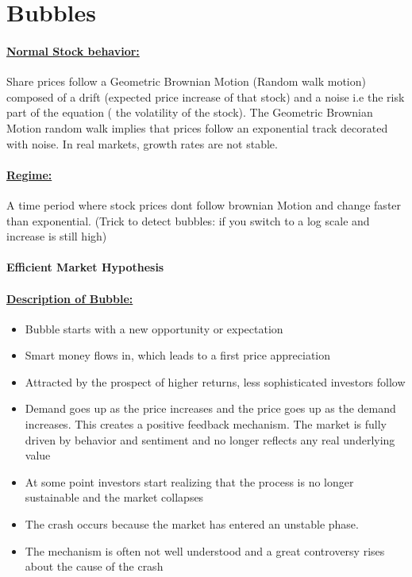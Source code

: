 \documentclass[8pt]{extreport}
\begin{document}
{\section{Bubbles}
\paragraph{\underline{Normal Stock behavior:}} Share prices follow a Geometric Brownian Motion (Random walk motion) composed of a drift (expected price increase of that stock) and a noise i.e the risk part of the equation ( the volatility of the stock). The Geometric Brownian Motion random walk implies that prices follow an exponential track decorated with noise. In real markets, growth rates are not stable.
\paragraph{\underline{Regime:}} A time period where stock prices dont follow brownian Motion and change faster than exponential. (Trick to detect bubbles: if you switch to a log scale and increase is still high)
\paragraph{Efficient Market Hypothesis}
\paragraph{\underline{Description of Bubble:}}
\begin{itemize}
\item Bubble starts with a new opportunity or expectation
\item Smart money flows in, which leads to a first price appreciation
\item Attracted by the prospect of higher returns, less sophisticated investors follow
\item Demand goes up as the price increases and the price goes up as the demand increases. This creates a positive feedback mechanism. The market is fully driven by behavior and sentiment and no longer reflects any real underlying value
\item At some point investors start realizing that the process is no longer sustainable and the market collapses
\item The crash occurs because the market has entered an unstable phase.
\item The mechanism is often not well understood and a great controversy rises about the cause of the crash
\end{itemize}
}
\end{document}
